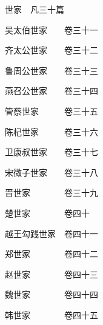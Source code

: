 \par\hspace{3.5em}世家　凡三十篇
\par\hspace{3.5em}吴太伯世家　　\hspace{1.5em}卷三十一
\par\hspace{3.5em}齐太公世家　　\hspace{1.5em}卷三十二
\par\hspace{3.5em}鲁周公世家　　\hspace{1.5em}卷三十三
\par\hspace{3.5em}燕召公世家　　\hspace{1.5em}卷三十四
\par\hspace{3.5em}管蔡世家　　　\hspace{1.5em}卷三十五
\par\hspace{3.5em}陈杞世家　　　\hspace{1.5em}卷三十六
\par\hspace{3.5em}卫康叔世家　　\hspace{1.5em}卷三十七
\par\hspace{3.5em}宋微子世家　　\hspace{1.5em}卷三十八
\par\hspace{3.5em}晋世家　　　　\hspace{1.5em}卷三十九
\par\hspace{3.5em}楚世家　　　　\hspace{1.5em}卷四十
\par\hspace{3.5em}越王勾践世家　\hspace{1.5em}卷四十一
\par\hspace{3.5em}郑世家　　　　\hspace{1.5em}卷四十二
\par\hspace{3.5em}赵世家　　　　\hspace{1.5em}卷四十三
\par\hspace{3.5em}魏世家　　　　\hspace{1.5em}卷四十四
\par\hspace{3.5em}韩世家　　　　\hspace{1.5em}卷四十五
